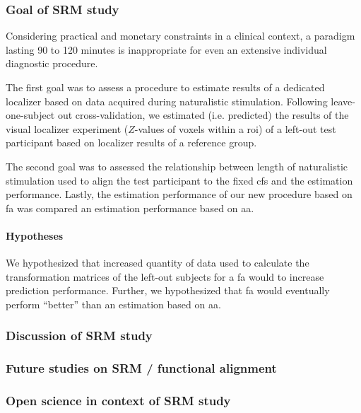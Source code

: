 \subsubsection{Goal of SRM study}
Considering practical and monetary constraints in a clinical context, a paradigm
lasting 90 to 120 minutes is inappropriate for even an extensive individual
diagnostic procedure.

The first goal was to assess a procedure to estimate results of a dedicated
localizer \citep{sengupta2016extension} based on data acquired during
naturalistic stimulation.
%
Following leave-one-subject out cross-validation, we estimated (i.e. predicted)
the results of the visual localizer experiment ($Z$-values of voxels within a
\ac{roi}) of a left-out test participant based on localizer results of a
reference group.

The second goal was to assessed the relationship between length of
naturalistic stimulation used to align the test participant to the fixed
\ac{cfs} and the estimation performance.
%
Lastly, the estimation performance of our new procedure based on \ac{fa} was
compared an estimation performance based on \ac{aa}.


\paragraph{Hypotheses}
%
We hypothesized that increased quantity of data used to calculate the
transformation matrices of the left-out subjects for a \ac{fa} would to increase
prediction performance.
%
Further, we hypothesized that \ac{fa} would eventually perform
``better'' than an estimation based on \ac{aa}.


\subsubsection{Discussion of SRM study}



\subsubsection{Future studies on SRM / functional alignment}



\subsubsection{Open science in context of SRM study}

